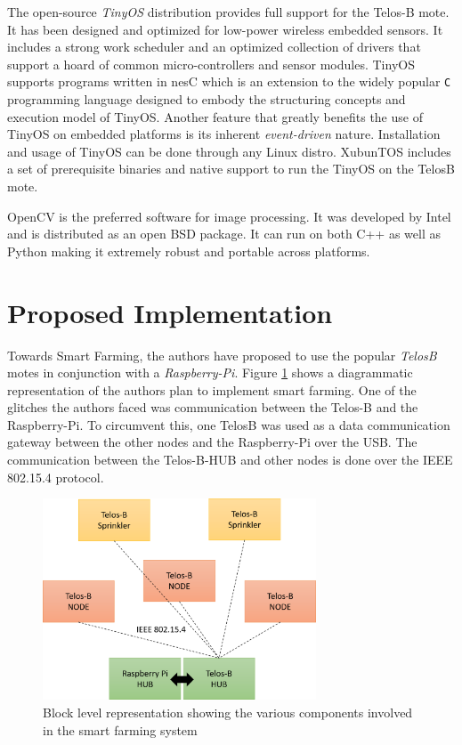 \documentclass{sig-alternate-05-2015}
\begin{document}
The open-source \textit{TinyOS}\cite{tinyos:tinyos} distribution provides full support for the Telos-B mote. It has been designed and optimized for low-power wireless embedded sensors. It includes a strong work scheduler and an optimized collection of drivers that support a hoard of common micro-controllers and sensor modules. TinyOS supports programs written in nesC\cite{nesc:nesc} which is an extension to the widely popular \texttt{C} programming language designed to embody the structuring concepts and execution model of TinyOS. Another feature that greatly benefits the use of TinyOS on embedded platforms is its inherent \textit{event-driven} nature. Installation and usage of TinyOS can be done through any Linux distro. XubunTOS includes a set of prerequisite binaries and native support to run the TinyOS on the TelosB mote.

OpenCV is the preferred software for image processing. It was developed by Intel\cite{intel:intel} and is distributed as an open BSD package. It can run on both C++ as well as Python making it extremely robust and portable across platforms. 

\section{Proposed Implementation}
Towards Smart Farming, the authors have proposed to use the popular \textit{TelosB}\cite{telosb:telosb} motes in conjunction with a \textit{Raspberry-Pi}\cite{rpi:rpi2}. Figure \ref{smart} shows a diagrammatic representation of the authors plan to implement smart farming. One of the glitches the authors faced was communication between the Telos-B and the Raspberry-Pi. To circumvent this, one TelosB was used as a data communication gateway between the other nodes and the Raspberry-Pi over the USB. The communication between the Telos-B-HUB and other nodes is done over the IEEE 802.15.4\cite{zigbee:zigbee} protocol.

\begin{figure}[h]
\centering
\includegraphics[width=3.2in]{sys.png}
\caption{Block level representation showing the various components involved in the smart farming system}
\label{smart}
\end{figure}
\end{document}
